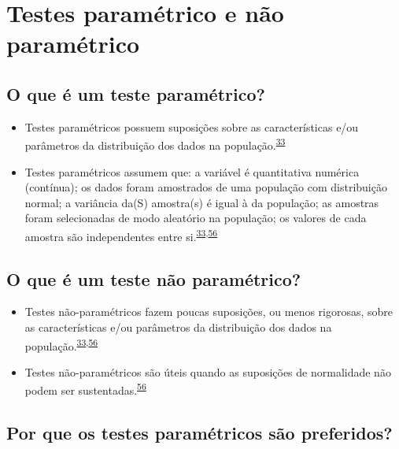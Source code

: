 \documentclass[
  a4paper,
]{book}
\begin{document}
\hypertarget{parametric-naoparametrico}{%
\section{Testes paramétrico e não paramétrico}\label{parametric-naoparametrico}}

\hypertarget{o-que-uxe9-um-teste-paramuxe9trico}{%
\subsection{O que é um teste paramétrico?}\label{o-que-uxe9-um-teste-paramuxe9trico}}

\begin{itemize}
\item
  Testes paramétricos possuem suposições sobre as características e/ou parâmetros da distribuição dos dados na população.\textsuperscript{\protect\hyperlink{ref-vetter2017}{33}}
\item
  Testes paramétricos assumem que: a variável é quantitativa numérica (contínua); os dados foram amostrados de uma população com distribuição normal; a variância da(S) amostra(s) é igual à da população; as amostras foram selecionadas de modo aleatório na população; os valores de cada amostra são independentes entre si.\textsuperscript{\protect\hyperlink{ref-vetter2017}{33},\protect\hyperlink{ref-Ali2016}{56}}
\end{itemize}

\hypertarget{o-que-uxe9-um-teste-nuxe3o-paramuxe9trico}{%
\subsection{O que é um teste não paramétrico?}\label{o-que-uxe9-um-teste-nuxe3o-paramuxe9trico}}

\begin{itemize}
\item
  Testes não-paramétricos fazem poucas suposições, ou menos rigorosas, sobre as características e/ou parâmetros da distribuição dos dados na população.\textsuperscript{\protect\hyperlink{ref-vetter2017}{33},\protect\hyperlink{ref-Ali2016}{56}}
\item
  Testes não-paramétricos são úteis quando as suposições de normalidade não podem ser sustentadas.\textsuperscript{\protect\hyperlink{ref-Ali2016}{56}}
\end{itemize}

\hypertarget{por-que-os-testes-paramuxe9tricos-suxe3o-preferidos}{%
\subsection{Por que os testes paramétricos são preferidos?}\label{por-que-os-testes-paramuxe9tricos-suxe3o-preferidos}}
\end{document}

